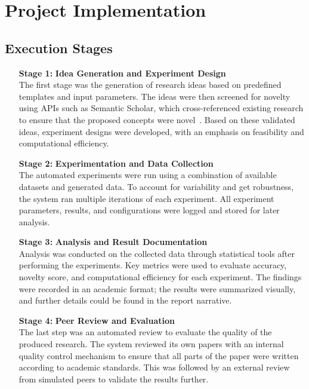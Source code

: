\section{Project Implementation}
\subsection{Execution Stages}
\begin{enumerate}[leftmargin=2cm, labelwidth=1.5cm]
    \item[\textbf{Stage 1:}] \textbf{Idea Generation and Experiment Design} \\
    The first stage was the generation of research ideas based on predefined templates and input parameters. The ideas were then screened for novelty using APIs such as Semantic Scholar, which cross-referenced existing research to ensure that the proposed concepts were novel~\cite{Shea2024PlaneSearch}. Based on these validated ideas, experiment designs were developed, with an emphasis on feasibility and computational efficiency.

    \item[\textbf{Stage 2:}] \textbf{Experimentation and Data Collection} \\
    The automated experiments were run using a combination of available datasets and generated data. To account for variability and get robustness, the system ran multiple iterations of each experiment. All experiment parameters, results, and configurations were logged and stored for later analysis.

    \item[\textbf{Stage 3:}] \textbf{Analysis and Result Documentation} \\
    Analysis was conducted on the collected data through statistical tools after performing the experiments. Key metrics were used to evaluate accuracy, novelty score, and computational efficiency for each experiment. The findings were recorded in an academic format; the results were summarized visually, and further details could be found in the report narrative.

    \item[\textbf{Stage 4:}] \textbf{Peer Review and Evaluation} \\
    The last step was an automated review to evaluate the quality of the produced research. The system reviewed its own papers with an internal quality control mechanism to ensure that all parts of the paper were written according to academic standards. This was followed by an external review from simulated peers to validate the results further.
\end{enumerate}

